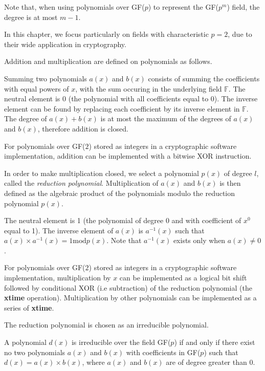 Note that, when using polynomials over GF($p$) to represent the GF($p^m$) field, the degree is at most $m-1$.

In this chapter, we focus particularly on fields with characteristic $p = 2$, due to their wide application in cryptography.

Addition and multiplication are defined on polynomials as follows.

\begin{concept}
Summing two polynomials $a(x)$ and $b(x)$ consists of summing the coefficients with equal powers of $x$, with the sum occuring in the underlying field $\mathbb{F}$. The neutral element is 0 (the polynomial with all coefficients equal to 0). The inverse element can be found by replacing each coefficient by its inverse element in $\mathbb{F}$. The degree of $a(x) + b(x)$ is at most the maximum of the degrees of $a(x)$ and $b(x)$, therefore addition is closed.
\end{concept}

For polynomials over GF($2$) stored as integers in a cryptographic software implementation, addition can be implemented with a bitwise XOR instruction.

\begin{concept}
In order to make multiplication closed, we select a polynomial $p(x)$ of degree $l$, called the \emph{reduction polynomial}. Multiplication of $a(x)$ and $b(x)$ is then defined as the algebraic product of the polynomials modulo the reduction polynomial $p(x)$.

The neutral element is 1 (the polynomial of degree 0 and with coefficient of $x^0$ equal to 1). The inverse element of $a(x)$ is $a^{-1}(x)$ such that $a(x) \times a^{-1}(x) = 1 \text{mod} p(x)$. Note that $a^{-1}(x)$ exists only when $a(x) \neq 0$.
\end{concept}

For polynomials over GF($2$) stored as integers in a cryptographic software implementation, multiplication by $x$ can be implemented as a logical bit shift followed by conditional XOR (i.e subtraction) of the reduction polynomial (the \textbf{xtime} operation). Multiplication by other polynomials can be implemented as a series of \textbf{xtime}.

The reduction polynomial is chosen as an irreducible polynomial.

\begin{concept}
A polynomial $d(x)$ is irreducible over the field GF($p$) if and only if there exist no two polynomials $a(x)$ and $b(x)$ with coefficients in GF($p$) such that $d(x) = a(x) \times b(x)$, where $a(x)$ and $b(x)$ are of degree greater than 0.
\end{concept}

